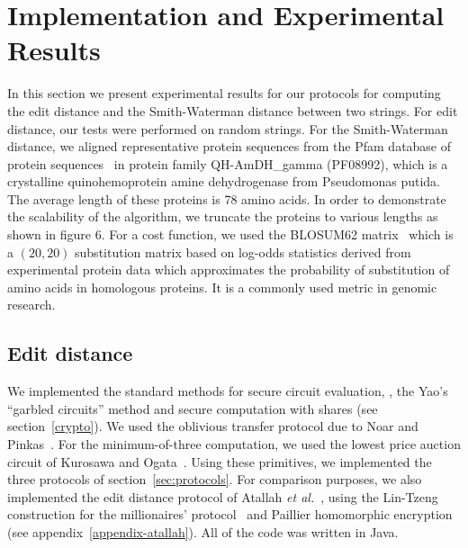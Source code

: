 \section{Implementation and Experimental Results}
\label{sec:experimental}

In this section we present experimental results for our protocols for
computing the edit distance and the Smith-Waterman distance between
two strings.  For edit distance, our tests were performed on random
strings.  For the Smith-Waterman distance, we aligned representative protein
sequences from the Pfam database of protein sequences~\cite{pfam2002}
in protein family {\sf QH-AmDH\_gamma (PF08992)}, which is a
crystalline quinohemoprotein amine dehydrogenase from Pseudomonas
putida.  The average length of these proteins is 78 amino acids.  In
order to demonstrate the scalability of the algorithm, we truncate the
proteins to various lengths as shown in figure 6.  For a cost
function, we used the BLOSUM62 matrix~\cite{blosum62} which is a
$(20,20)$ substitution matrix based on log-odds statistics derived
from experimental protein data which approximates the probability of
substitution of amino acids in homologous proteins.  It is a commonly
used metric in genomic research.

\subsection{Edit distance}


We implemented the standard methods for secure circuit evaluation,
\ie, the Yao's ``garbled circuits'' method and secure computation with
shares (see section~\ref{crypto}).  We used the oblivious transfer
protocol due to Noar and Pinkas~\cite{Naor-Pinkas:2001}.  For the
minimum-of-three computation, we used the lowest price auction circuit of
Kurosawa and Ogata~\cite{KO02}.  Using these primitives, we implemented
the three protocols of section~\ref{sec:protocols}.  For comparison
purposes, we also implemented the edit distance protocol of Atallah
\textit{et al.}~\cite{atallah}, using the Lin-Tzeng construction for
the millionaires' protocol~\cite{lintzeng-acns05} and Paillier homomorphic
encryption~\cite{Paillier99} (see appendix~\ref{appendix-atallah}).
All of the code was written in Java.

